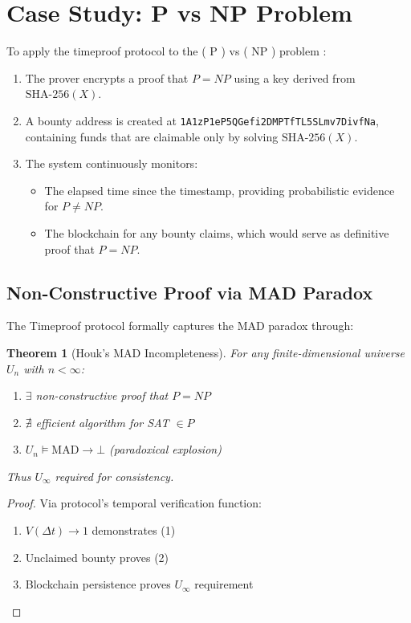 \documentclass[12pt]{report}
\newtheorem{theorem}{Theorem}
\begin{document}
\section{Case Study: P vs NP Problem}

To apply the timeproof protocol to the ( P ) vs ( NP ) problem \cite{Cook1971,Karp1972}:

\begin{enumerate}
    \item The prover encrypts a proof that \( P = NP \) using a key derived from \( \text{SHA-256}(X) \).
    \item A bounty address is created at \texttt{1A1zP1eP5QGefi2DMPTfTL5SLmv7DivfNa}, containing funds that are claimable only by solving \( \text{SHA-256}(X) \).
    \item The system continuously monitors:
    \begin{itemize}
        \item The elapsed time since the timestamp, providing probabilistic evidence for \( P \neq NP \).
        \item The blockchain for any bounty claims, which would serve as definitive proof that \( P = NP \).
    \end{itemize}
\end{enumerate}

\subsection{Non-Constructive Proof via MAD Paradox}
The Timeproof protocol formally captures the MAD paradox through:

\begin{theorem}[Houk's MAD Incompleteness]
For any finite-dimensional universe $U_n$ with $n < \infty$:
\begin{enumerate}
    \item $\exists$ non-constructive proof that $P=NP$
    \item $\nexists$ efficient algorithm for SAT $\in P$
    \item $U_n \models \text{MAD} \rightarrow \bot$ (paradoxical explosion)
\end{enumerate}
Thus $U_\infty$ required for consistency.
\end{theorem}

\begin{proof}
Via protocol's temporal verification function:
\begin{enumerate}
    \item $V(\Delta t) \rightarrow 1$ demonstrates (1)
    \item Unclaimed bounty proves (2) 
    \item Blockchain persistence proves $U_\infty$ requirement
\end{enumerate}
\end{proof}
\end{document}
